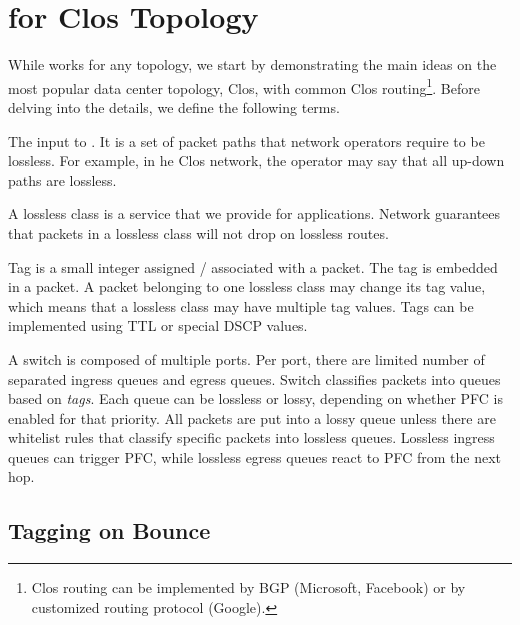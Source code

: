 \section{\sysname{} for Clos Topology}
\label{sec:specific}

While \sysname{} works for any topology, we start by demonstrating the main
ideas on the most popular data center topology, Clos, with common Clos
routing\footnote{Clos routing can be implemented by BGP (Microsoft, Facebook) or
by customized routing protocol (Google).}.  Before delving into the details, we
define the following terms.

 The input to \sysname{}. It is a set of packet paths
that network operators require to be lossless. For example, in he Clos network,
the operator may say that all up-down paths are lossless.

 A lossless class is a service that we provide for
applications.  Network guarantees that packets in a lossless class will not drop
on lossless routes. 

 Tag is a small integer assigned / associated with a packet. The tag
is embedded in a packet. A packet belonging to one lossless class may change its
tag value, which means that a lossless class may have multiple tag values. Tags
can be implemented using TTL or special DSCP values.

 A switch is composed of multiple ports.  Per port, there
are limited number of separated ingress queues and egress queues.  Switch
classifies packets into queues based on {\em tags}.  Each queue can be lossless
or lossy, depending on whether PFC is enabled for that priority.  All packets
are put into a lossy queue unless there are whitelist rules that classify
specific packets into lossless queues. Lossless ingress queues can trigger PFC,
while lossless egress queues react to PFC from the next hop.

\subsection{Tagging on Bounce}\label{subsec:tag}

